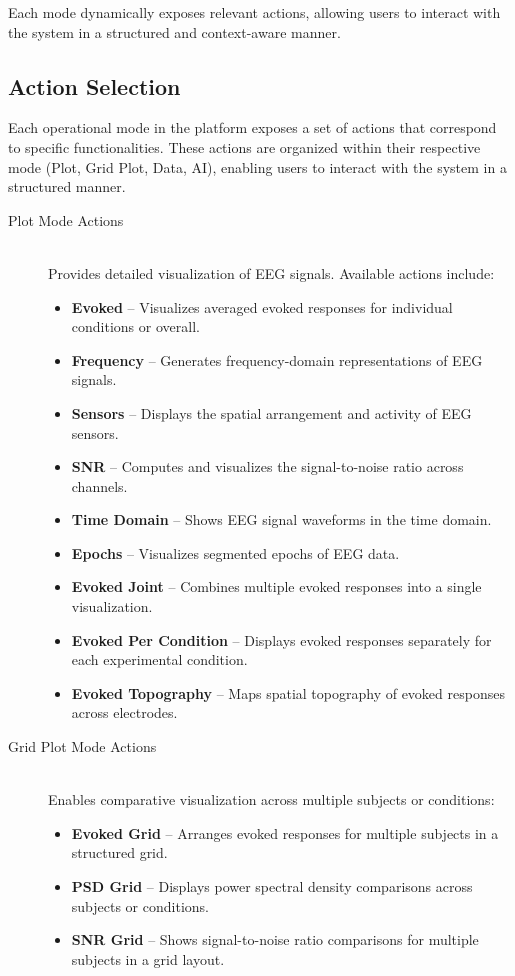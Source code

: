 Each mode dynamically exposes relevant actions, allowing users to interact with the system in a structured and context-aware manner.

\subsection{Action Selection}
\label{sec:action-selection}

Each operational mode in the platform exposes a set of actions that correspond to specific functionalities. These actions are organized within their respective mode (Plot, Grid Plot, Data, AI), enabling users to interact with the system in a structured manner.

\begin{description}
    \item[Plot Mode Actions] \hfill \\
    Provides detailed visualization of EEG signals. Available actions include:
    \begin{itemize}
        \item \textbf{Evoked} – Visualizes averaged evoked responses for individual conditions or overall.
        \item \textbf{Frequency} – Generates frequency-domain representations of EEG signals.
        \item \textbf{Sensors} – Displays the spatial arrangement and activity of EEG sensors.
        \item \textbf{SNR} – Computes and visualizes the signal-to-noise ratio across channels.
        \item \textbf{Time Domain} – Shows EEG signal waveforms in the time domain.
        \item \textbf{Epochs} – Visualizes segmented epochs of EEG data.
        \item \textbf{Evoked Joint} – Combines multiple evoked responses into a single visualization.
        \item \textbf{Evoked Per Condition} – Displays evoked responses separately for each experimental condition.
        \item \textbf{Evoked Topography} – Maps spatial topography of evoked responses across electrodes.
    \end{itemize}

    \item[Grid Plot Mode Actions] \hfill \\
    Enables comparative visualization across multiple subjects or conditions:
    \begin{itemize}
        \item \textbf{Evoked Grid} – Arranges evoked responses for multiple subjects in a structured grid.
        \item \textbf{PSD Grid} – Displays power spectral density comparisons across subjects or conditions.
        \item \textbf{SNR Grid} – Shows signal-to-noise ratio comparisons for multiple subjects in a grid layout.
    \end{itemize}


\end{description}
